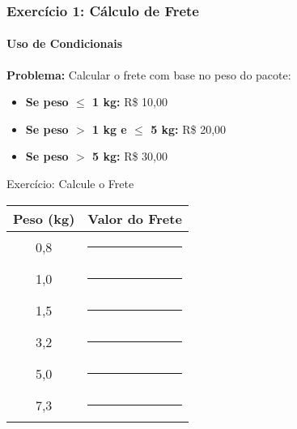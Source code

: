 \documentclass[12pt]{beamer}
\begin{document}
\begin{frame}
    \frametitle{Exercício 1: Cálculo de Frete}
    \framesubtitle{Uso de Condicionais}

    \textbf{Problema:} Calcular o frete com base no peso do pacote:
    \begin{itemize}
        \item \textbf{Se peso $\leq$ 1 kg:} R\$ 10,00
        \item \textbf{Se peso $>$ 1 kg e $\leq$ 5 kg:} R\$ 20,00
        \item \textbf{Se peso $>$ 5 kg:} R\$ 30,00
    \end{itemize}

    \begin{exampleblock}{Exercício: Calcule o Frete}
        \begin{tabular}{|c|c|}
            \hline
            \textbf{Peso (kg)} & \textbf{Valor do Frete} \\ \hline
            0,8 & \rule{2cm}{} \\ \hline
            1,0 & \rule{2cm}{} \\ \hline
            1,5 & \rule{2cm}{} \\ \hline
            3,2 & \rule{2cm}{} \\ \hline
            5,0 & \rule{2cm}{} \\ \hline
            7,3 & \rule{2cm}{} \\ \hline
        \end{tabular}
    \end{exampleblock}
\end{frame}
\end{document}
